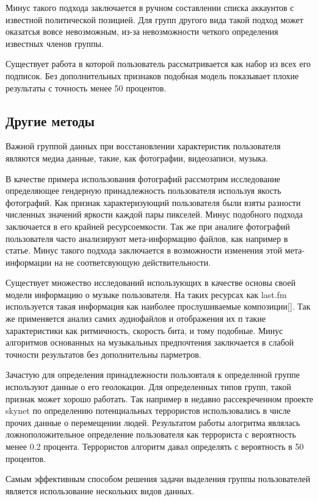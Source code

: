 \documentclass[annotation,times,page4]{itmo-student-thesis}
\begin{document}
Минус такого подхода заключается в ручном составлении списка аккаунтов с известной политической позицией. Для групп другого вида такой подход может оказатсья вовсе невозможным, из-за невозможности четкого определения известных членов группы.

Существует работа в которой пользователь рассматривается как набор из всех его подписок. Без дополнительных признаков подобная модель показывает плохие результаты с точность менее 50 процентов. 
  
\subsection{Другие методы}
Важной группой данных при восстановлении характеристик пользователя являются медиа данные, такие, как фотографии, видеозаписи, музыка. 

В качестве примера использования фотографий рассмотрим исследование определяющее гендерную принадлежность пользователя используя якость фотографий. Как признак характеризующий пользователя были взяты разности численных значений яркости каждой пары пикселей. Минус подобного подхода заключается в его крайней ресурсоемкости. Так же при аналиге фотографий пользователя часто анализируют мета-информацию файлов, как например в статье. Минус такого подхода заключается в возможности изменения этой мета-информации на не соответсвующую действительности.

Существует множество исследований использующих в качестве основы своей модели информацию о музыке пользователя. На таких ресурсах как last.fm используется такая информация как наиболее прослушиваемые композиции[]. Так же применяется анализ самих аудиофайлов и отображения их п такие характеристики как ритмичность, скорость бита, и тому подобные. Минус алгоритмов основанных на музыкальных предпочтения заключается в слабой точности результатов без дополнительны парметров.

Зачастую для определения принадлежности пользовталя к определнной группе используют данные о его геолокации. Для определенных типов групп, такой признак может хорошо работать. Так например в недавно рассекреченном проекте skynet по определению потенциальных террористов использовались в числе прочих данные о перемещении людей. Результатом работы алогритма являлась ложноположительное определение пользователя как террориста с вероятность менее 0.2 процента. Террористов алгоритм давал определять с вероятность в 50 процентов.

Самым эффективным способом решения задачи выделения группы пользователей является использование нескольких видов данных. 
\end{document}
